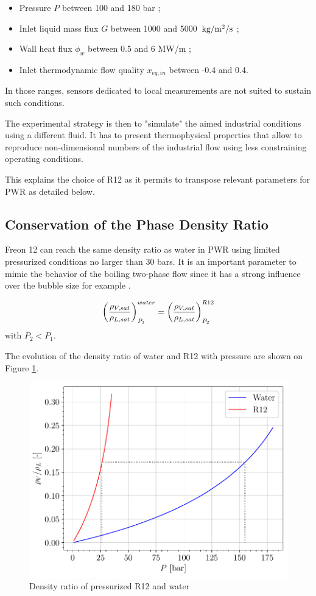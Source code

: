 \begin{itemize}
\item Pressure $P$ between 100 and 180 bar ;
\item Inlet liquid mass flux $G$ between 1000 and 5000~$\text{kg/m$^{2}$/s}$ ;
\item Wall heat flux $\phi_{w}$ between 0.5 and 6 MW/m ;
\item Inlet thermodynamic flow quality $x_{eq,in}$ between -0.4 and 0.4.
\end{itemize}

In those ranges, sensors dedicated to local measurements are not suited to sustain such conditions. 

\npar

The experimental strategy is then to "simulate" the aimed industrial conditions using a different fluid. It has to present thermophysical properties that allow to reproduce non-dimensional numbers of the industrial flow using less constraining operating conditions.

\npar

This explains the choice of R12 as it permits to transpose relevant parameters for PWR as detailed below.

\subsection{Conservation of the Phase Density Ratio}


Freon 12 can reach the same density ratio as water in PWR using limited pressurized conditions no larger than 30 bars. It is an important parameter to mimic the behavior of the boiling two-phase flow since it has a strong influence over the bubble size for example \cite{kocamustafaogullari_pressure_1983}.

\begin{equation}
\left( \frac{\rho_{V,sat}}{\rho_{L,sat}} \right)_{P_{1}}^{water} = \left( \frac{\rho_{V,sat}}{\rho_{L,sat}} \right)_{P_{2}}^{R12}
\end{equation} 
with $P_{2} < P_{1}$.

\npar

The evolution of the density ratio of water and R12 with pressure are shown on Figure \ref{fig:rhost_R12_PWR}.

\begin{figure}[!h]
\centering
\includegraphics[width=0.6\linewidth]{img/DEBORA/rhost_R12_PWR.pdf}
\caption{Density ratio of pressurized R12 and water}
\label{fig:rhost_R12_PWR}
\end{figure}


